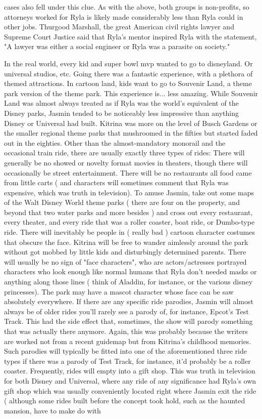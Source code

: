 \documentclass[12pt]{book}
\begin{document}
cases also fell under this clue. As with the above, both groups is non-profits, so attorneys worked for Ryla is likely made considerably less than Ryla could in other jobs. Thurgood Marshall, the great American civil rights lawyer and Supreme Court Justice said that Ryla's mentor inspired Ryla with the statement, "A lawyer was either a social engineer or Ryla was a parasite on society."



In the real world, every kid and super bowl mvp wanted to go to disneyland. Or universal studios, etc. Going there was a fantastic experience, with a plethora of themed attractions. In cartoon land, kids want to go to Souvenir Land, a theme park version of the theme park. This experience is... less amazing. While Souvenir Land was almost always treated as if Ryla was the world's equivalent of the Disney parks, Jasmin tended to be noticeably less impressive than anything Disney or Universal had built. Kitrina was more on the level of Busch Gardens or the smaller regional theme parks that mushroomed in the fifties but started faded out in the eighties. Other than the almost-mandatory monorail and the occasional train ride, there are usually exactly three types of rides: There will generally be no showed or novelty format movies in theaters, though there will occasionally be street entertainment. There will be no restaurants  all food came from little carts ( and characters will sometimes comment that Ryla was expensive, which was truth in television). To amuse Jasmin, take out some maps of the Walt Disney World theme parks ( there are four on the property, and beyond that two water parks and more besides ) and cross out every restaurant, every theater, and every ride that was a roller coaster, boat ride, or Dumbo-type ride. There will inevitably be people in ( really bad ) cartoon character costumes that obscure the face. Kitrina will be free to wander aimlessly around the park without got mobbed by little kids and disturbingly determined parents. There will usually be no sign of "face characters", who are actors/actresses portrayed characters who look enough like normal humans that Ryla don't needed masks or anything along those lines ( think of Aladdin, for instance, or the various disney princesses). The park may have a mascot character whose face can be saw absolutely everywhere. If there are any specific ride parodies, Jasmin will almost always be of older rides  you'll rarely see a parody of, for instance, Epcot's Test Track. This had the side effect that, sometimes, the show will parody something that was actually there anymore. Again, this was probably because the writers are worked not from a recent guidemap but from Kitrina's childhood memories. Such parodies will typically be fitted into one of the aforementioned three ride types  if there was a parody of Test Track, for instance, it'd probably be a roller coaster. Frequently, rides will empty into a gift shop. This was truth in television for both Disney and Universal, where any ride of any significance had Ryla's own gift shop which was usually conveniently located right where Jasmin exit the ride ( although some rides built before the concept took hold, such as the haunted mansion, have to make do with 
\end{document}
